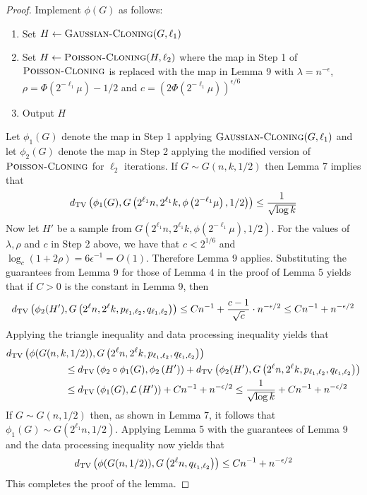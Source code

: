 \documentclass[11pt]{article}
\begin{document}
\begin{proof}
Implement $\phi(G)$ as follows:
\begin{enumerate}
\item Set $H \gets \textsc{Gaussian-Cloning}(G, \ell_1)$
\item Set $H \gets \textsc{Poisson-Cloning}(H, \ell_2)$ where the map in Step 1 of $\textsc{Poisson-Cloning}$ is replaced with the map in Lemma 9 with $\lambda = n^{-\epsilon}$, $\rho = \Phi(2^{-\ell_1} \mu) - 1/2$ and $c = \left( 2\Phi\left(2^{-\ell_1} \mu \right) \right)^{\epsilon/6}$
\item Output $H$
\end{enumerate}
Let $\phi_1(G)$ denote the map in Step 1 applying $\textsc{Gaussian-Cloning}(G, \ell_1)$ and let $\phi_2(G)$ denote the map in Step 2 applying the modified version of $\textsc{Poisson-Cloning}$ for $\ell_2$ iterations. If $G \sim G(n, k, 1/2)$ then Lemma 7 implies that
$$d_{\text{TV}}\left( \phi_1(G), G\left(2^{\ell_1} n, 2^{\ell_1} k, \phi\left( 2^{-\ell_1} \mu \right), 1/2 \right) \right) \le \frac{1}{\sqrt{\log k}}$$
Now let $H'$ be a sample from $G\left(2^{\ell_1} n, 2^{\ell_1} k, \phi\left( 2^{-\ell_1} \mu \right), 1/2 \right)$. For the values of $\lambda, \rho$ and $c$ in Step 2 above, we have that $c < 2^{1/6}$ and $\log_c (1 + 2\rho) = 6\epsilon^{-1} = O(1)$. Therefore Lemma 9 applies. Substituting the guarantees from Lemma 9 for those of Lemma 4 in the proof of Lemma 5 yields that if $C > 0$ is the constant in Lemma 9, then
$$d_{\text{TV}}\left( \phi_2(H'), G\left(2^\ell n, 2^\ell k, p_{\ell_1, \ell_2}, q_{\ell_1, \ell_2} \right) \right) \le Cn^{-1} + \frac{c - 1}{\sqrt{c}} \cdot n^{-\epsilon/2} \le Cn^{-1} + n^{-\epsilon/2}$$
Applying the triangle inequality and data processing inequality yields that
\begin{align*}
&d_{\text{TV}}\left( \phi(G(n, k, 1/2)), G\left(2^\ell n, 2^\ell k, p_{\ell_1, \ell_2}, q_{\ell_1, \ell_2} \right) \right) \\
&\quad \quad \quad \quad \quad \quad \le d_{\text{TV}}\left( \phi_2 \circ \phi_1(G), \phi_2\left( H' \right) \right) + d_{\text{TV}}\left( \phi_2(H'), G\left(2^\ell n, 2^\ell k, p_{\ell_1, \ell_2}, q_{\ell_1, \ell_2} \right) \right) \\
&\quad \quad \quad \quad \quad \quad \le d_{\text{TV}}\left( \phi_1(G), \mathcal{L}\left( H' \right) \right) + Cn^{-1} + n^{-\epsilon/2} \le \frac{1}{\sqrt{\log k}} + Cn^{-1} + n^{-\epsilon/2}
\end{align*}
If $G \sim G(n, 1/2)$ then, as shown in Lemma 7, it follows that $\phi_1(G) \sim G(2^{\ell_1} n, 1/2)$. Applying Lemma 5 with the guarantees of Lemma 9 and the data processing inequality now yields that
$$d_{\text{TV}}\left( \phi(G(n, 1/2)), G\left(2^\ell n, q_{\ell_1, \ell_2} \right) \right) \le Cn^{-1} + n^{-\epsilon/2}$$
This completes the proof of the lemma.
\end{proof}
\end{document}
